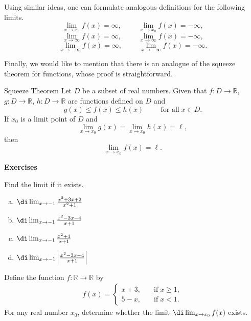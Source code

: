 \begin{remark}{}
Using similar ideas, one can formulate analogous definitions for the following limits.
\[
 \lim_{x\rightarrow x_0}f(x)=\infty,\hspace{1cm}
 \lim_{x\rightarrow x_0}f(x)=-\infty,\]
\[\lim_{x\rightarrow \infty}f(x)=\infty,\hspace{1cm}
 \lim_{x\rightarrow \infty}f(x)=-\infty,\]
 \[
 \lim_{x\rightarrow -\infty}f(x)=\infty,\hspace{1cm}
 \lim_{x\rightarrow -\infty}f(x)=-\infty.\]
 
\end{remark}

Finally, we would like to mention that there is an analogue of the squeeze theorem for functions, whose proof is straightforward.
\begin{theorem}{Squeeze Theorem}
Let $D$ be a subset of real numbers. Given that   $f:D\rightarrow\mathbb{R}$, $g:D\rightarrow\mathbb{R}$, $h:D\rightarrow\mathbb{R}$ are functions defined on $D$ and
\[g(x)\leq f(x)\leq h(x)\hspace{1cm}\text{for all}\;x\in D.\]
If $x_0$ is a limit point of $D$ and
\[\lim_{x\rightarrow x_0}g(x)=\lim_{x\rightarrow x_0}h(x)=\ell,\]then
\[\lim_{x\rightarrow x_0}f(x)=\ell.\]
\end{theorem}

\sbr
\noindent
{\bf \large Exercises  \thesection}
\setcounter{myquestion}{1}



 \begin{question}{\themyquestion}
  Find the limit if it exists.
 \begin{enumerate}[(a)]
 \item
 $\di\lim_{x\rightarrow -1}\frac{x^2+3x+2}{x^2+1}$
 
 \item $\di \lim_{x\rightarrow -1}\frac{x^2-3x-4}{x+1}$
 
 \item $\di \lim_{x\rightarrow -1}\frac{x^2+1}{x+1}$
 
 \item  $\di \lim_{x\rightarrow -1}\left|\frac{x^2-3x-4}{x+1}\right|$
 \end{enumerate}
\end{question}
\atc
\begin{question}{\themyquestion}
  Define the function $f:\mathbb{R}\rightarrow\mathbb{R}$   by
 \begin{align*}
 f(x)=\begin{cases}x+3,\quad & \text{if}\; x\geq 1,
 \\5-x,\quad & \text{if}\;x<1.\end{cases}
 \end{align*}
 For any  real number $x_0$, determine whether the limit $\di\lim_{x\rightarrow x_0}f(x)$ exists.
\end{question}

